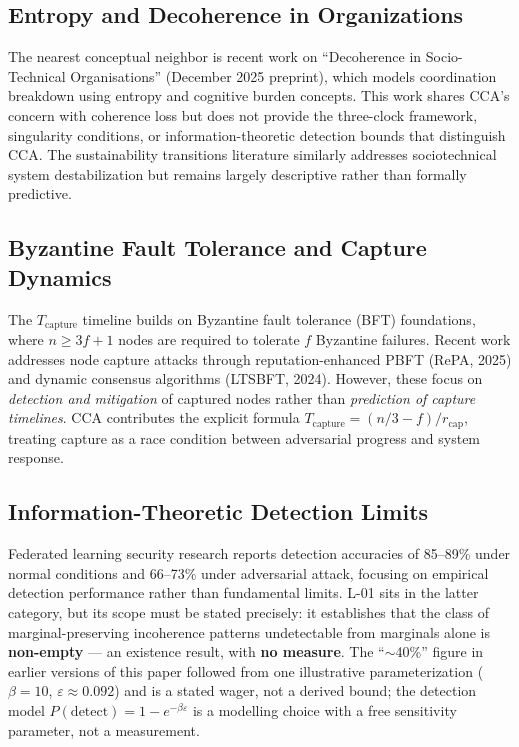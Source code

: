 \documentclass[11pt,a4paper]{article}
\theoremstyle{definition}
\theoremstyle{remark}
\newcommand{\Tcapture}{T_{\text{capture}}}
\begin{document}
\subsection{Entropy and Decoherence in Organizations}

The nearest conceptual neighbor is recent work on ``Decoherence in Socio-Technical Organisations'' (December 2025 preprint), which models coordination breakdown using entropy and cognitive burden concepts. This work shares CCA's concern with coherence loss but does not provide the three-clock framework, singularity conditions, or information-theoretic detection bounds that distinguish CCA. The sustainability transitions literature similarly addresses sociotechnical system destabilization but remains largely descriptive rather than formally predictive.

\subsection{Byzantine Fault Tolerance and Capture Dynamics}

The $\Tcapture$ timeline builds on Byzantine fault tolerance (BFT) foundations, where $n \geq 3f+1$ nodes are required to tolerate $f$ Byzantine failures. Recent work addresses node capture attacks through reputation-enhanced PBFT (RePA, 2025) and dynamic consensus algorithms (LTSBFT, 2024). However, these focus on \textit{detection and mitigation} of captured nodes rather than \textit{prediction of capture timelines}. CCA contributes the explicit formula $\Tcapture = (n/3 - f)/r_{\text{cap}}$, treating capture as a race condition between adversarial progress and system response.

\subsection{Information-Theoretic Detection Limits}

Federated learning security research reports detection accuracies of 85--89\% under normal conditions and 66--73\% under adversarial attack, focusing on empirical detection performance rather than fundamental limits. L-01 sits in the latter category, but its scope must be stated precisely: it establishes that the class of marginal-preserving incoherence patterns undetectable from marginals alone is \textbf{non-empty} --- an existence result, with \textbf{no measure}. The ``$\sim$40\%'' figure in earlier versions of this paper followed from one illustrative parameterization ($\beta = 10$, $\varepsilon \approx 0.092$) and is a stated wager, not a derived bound; the detection model $P(\text{detect}) = 1 - e^{-\beta\varepsilon}$ is a modelling choice with a free sensitivity parameter, not a measurement.
\end{document}
